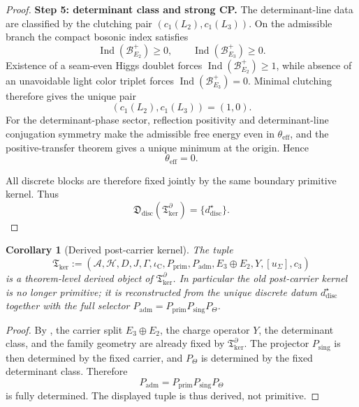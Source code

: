 \documentclass[11pt,a4paper]{article}
\newtheorem{corollary}[theorem]{Corollary}
\theoremstyle{definition}
\theoremstyle{remark}
\DeclareMathOperator{\Ind}{Ind}
\newcommand{\iC}{\iota_{\mathrm C}}
\newcommand{\cthree}{c_3}
\newcommand{\Tker}{\mathfrak T_{\mathrm{ker}}}
\newcommand{\Padm}{P_{\mathrm{adm}}}
\newcommand{\Pprim}{P_{\mathrm{prim}}}
\begin{document}
\begin{proof}
\textbf{Step 5: determinant class and strong CP.}
The determinant-line data are classified by the clutching pair $(c_1(L_2),c_1(L_3))$. On the
admissible branch the compact bosonic index satisfies
\[
\Ind(\mathcal B_{E_2}^+)\ge 0,
\qquad
\Ind(\mathcal B_{E_3}^+)\ge 0.
\]
Existence of a seam-even Higgs doublet forces $\Ind(\mathcal B_{E_2}^+)\ge 1$, while absence of an
unavoidable light color triplet forces $\Ind(\mathcal B_{E_3}^+)=0$. Minimal clutching therefore
gives the unique pair
\[
(c_1(L_2),c_1(L_3))=(1,0).
\]
For the determinant-phase sector, reflection positivity and determinant-line conjugation symmetry
make the admissible free energy even in $\theta_{\mathrm{eff}}$, and the positive-transfer theorem
gives a unique minimum at the origin. Hence
\[
\theta_{\mathrm{eff}}=0.
\]

All discrete blocks are therefore fixed jointly by the same boundary primitive kernel. Thus
\[
\mathfrak D_{\mathrm{disc}}(\Tker^\partial)=\{d^\star_{\mathrm{disc}}\}.
\]
\end{proof}

\begin{corollary}[Derived post-carrier kernel]
\label{cor:derived-post-carrier-kernel}
The tuple
\[
\Tker
:=
(\mathcal A,\mathcal H,D,J,\Gamma,\iC,\Pprim,\Padm,E_3\oplus E_2,Y,[u_\Sigma],\cthree)
\]
is a theorem-level derived object of $\Tker^\partial$. In particular the old post-carrier kernel is
no longer primitive; it is reconstructed from the unique discrete datum $d^\star_{\mathrm{disc}}$
together with the full selector $\Padm=\Pprim P_{\mathrm{sing}}P_\Theta$.
\end{corollary}

\begin{proof}
By , the carrier split $E_3\oplus E_2$, the charge
operator $Y$, the determinant class, and the family geometry are already fixed by
$\Tker^\partial$. The projector $P_{\mathrm{sing}}$ is then determined by the fixed carrier, and
$P_\Theta$ is determined by the fixed determinant class. Therefore
\[
\Padm=\Pprim P_{\mathrm{sing}}P_\Theta
\]
is fully determined. The displayed tuple is thus derived, not primitive.
\end{proof}
\end{document}
